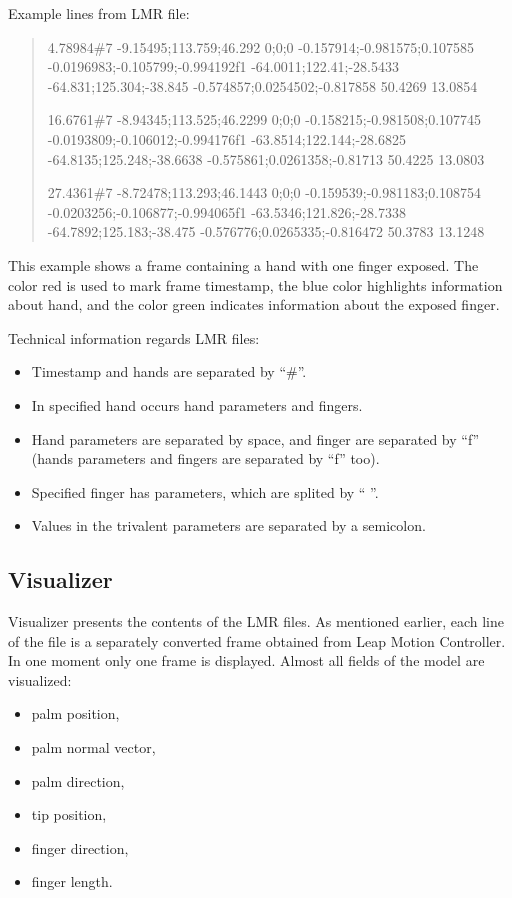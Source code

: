 Example lines from LMR file:
\begin{quote}
{\color{red}4.78984}\#{\color{blue}7 -9.15495;113.759;46.292 0;0;0 -0.157914;-0.981575;0.107585 -0.0196983;-0.105799;-0.994192}f1 {\color{green} -64.0011;122.41;-28.5433 -64.831;125.304;-38.845 -0.574857;0.0254502;-0.817858 50.4269 13.0854}

{\color{red}16.6761}\#{\color{blue}7 -8.94345;113.525;46.2299 0;0;0 -0.158215;-0.981508;0.107745 -0.0193809;-0.106012;-0.994176}f1 {\color{green} -63.8514;122.144;-28.6825 -64.8135;125.248;-38.6638 -0.575861;0.0261358;-0.81713 50.4225 13.0803}

{\color{red}27.4361}\#{\color{blue}7 -8.72478;113.293;46.1443 0;0;0 -0.159539;-0.981183;0.108754 -0.0203256;-0.106877;-0.994065}f1 {\color{green} -63.5346;121.826;-28.7338 -64.7892;125.183;-38.475 -0.576776;0.0265335;-0.816472 50.3783 13.1248}
\end{quote}

This example shows a frame containing a hand with one finger exposed. The color red is used to mark frame timestamp, the blue color 
highlights information about hand, and the color green indicates information about the exposed finger.


Technical information regards LMR files:
\begin{itemize}
\item Timestamp and hands are separated by ``\#''. 
\item In specified hand occurs hand parameters and fingers. 
\item Hand parameters are separated by space, and finger are separated by ``f'' (hands parameters and fingers are separated by ``f'' too). 
\item Specified finger has parameters, which are splited by `` ''. 
\item Values in the trivalent parameters are separated by a semicolon.
\end{itemize}

\subsection{Visualizer}
Visualizer presents the contents of the LMR files. As mentioned earlier, each line of the file is a separately converted frame obtained from Leap Motion Controller. In one moment only one frame is displayed.
Almost all fields of the model are visualized:
\begin{itemize}
\item palm position,
\item palm normal vector,
\item palm direction,
\item tip position,
\item finger direction,
\item finger length.
\end{itemize}

